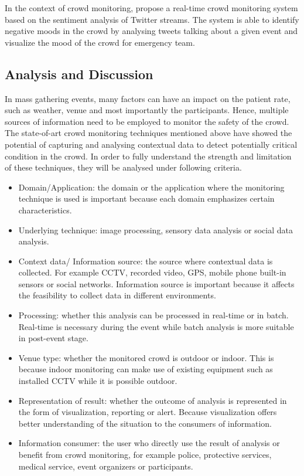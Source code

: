 In the context of crowd monitoring, \citet{DelirHaghighi2013} propose a real-time crowd monitoring system based on the sentiment analysis of Twitter streams. The system is able to identify negative moods in the crowd by analysing tweets talking about a given event and visualize the mood of the crowd for emergency team.

\subsection{Analysis and Discussion}
In mass gathering events, many factors can have an impact on the patient rate, such as weather, venue and most importantly the participants. Hence, multiple sources of information need to be employed to monitor the safety of the crowd. The state-of-art crowd monitoring techniques mentioned above have showed the potential of capturing and analysing contextual data to detect potentially critical condition in the crowd. In order to fully understand the strength and limitation of these techniques, they will be analysed under following criteria.

\begin{itemize}
	\item Domain/Application: the domain or the application where the monitoring technique is used is important because each domain emphasizes certain characteristics. 
	\item Underlying technique: image processing, sensory data analysis or social data analysis.
	\item Context data/ Information source: the source where contextual data is collected. For example CCTV, recorded video, GPS, mobile phone built-in sensors or social networks. Information source is important because it affects the feasibility to collect data in different environments.
	\item Processing: whether this analysis can be processed in real-time or in batch. Real-time is necessary during the event while batch analysis is more suitable in post-event stage.
	\item Venue type: whether the monitored crowd is outdoor or indoor. This is because indoor monitoring can make use of existing equipment such as installed CCTV while it is possible outdoor.
	\item Representation of result: whether the outcome of analysis is represented in the form of visualization, reporting or alert. Because visualization offers better understanding of the situation to the consumers of information.
	\item Information consumer: the user who directly use the result of analysis or benefit from crowd monitoring, for example police, protective services, medical service, event organizers or participants.
\end{itemize}

